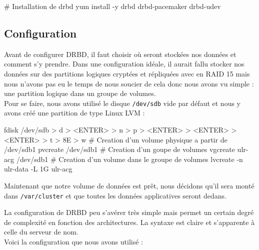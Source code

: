 \documentclass[11pt,a4paper]{report}
\begin{document}
                \begin{bashcode}
                    # Installation de drbd
                    yum install -y drbd drbd-pacemaker drbd-udev
                \end{bashcode}
                
            \subsection{Configuration}
                
                Avant de configurer DRBD, il faut choisir o\`u seront stock\'ees nos donn\'ees et comment s'y prendre. Dans une configuration id\'eale, il aurait fallu stocker nos donn\'ees sur des partitions logiques crypt\'ees et r\'epliqu\'ees avec en RAID 15 mais nous n'avons pas eu le temps de nous soucier de cela donc nous avons vu simple : une partition logique dans un groupe de volumes.\\
                
                Pour se faire, nous avons utilis\'e le disque \verb+/dev/sdb+ vide par d\'efaut et nous y avons cr\'e\'e une partition de type Linux LVM :\\
                
                \begin{bashcode}
                    fdisk /dev/sdb
                    > d
                    > <ENTER>
                    > n
                    > p
                    > <ENTER>
                    > <ENTER>
                    > <ENTER>
                    > t
                    > 8E
                    > w
                    # Creation d'un volume physique a partir de /dev/sdb1
                    pvcreate /dev/sdb1
                    # Creation d'un goupe de volumes
                    vgcreate ulr-acg /dev/sdb1
                    # Creation d'un volume dans le groupe de volumes
                    lvcreate -n ulr-data -L 1G ulr-acg
                \end{bashcode}
                
                Maintenant que notre volume de donn\'ees est pr\^et, nous d\'ecidons qu'il sera mont\'e dans \verb+/var/cluster+ et que toutes les donn\'ees applicatives seront dedans.
                
                La configuration de DRBD peu s'av\'erer tr\`es simple mais permet un certain degr\'e de complexit\'e en fonction des architectures. La syntaxe est claire et s'apparente \`a celle du serveur de nom.\\
                Voici la configuration que nous avons utilis\'e :\\
                
\end{document}
